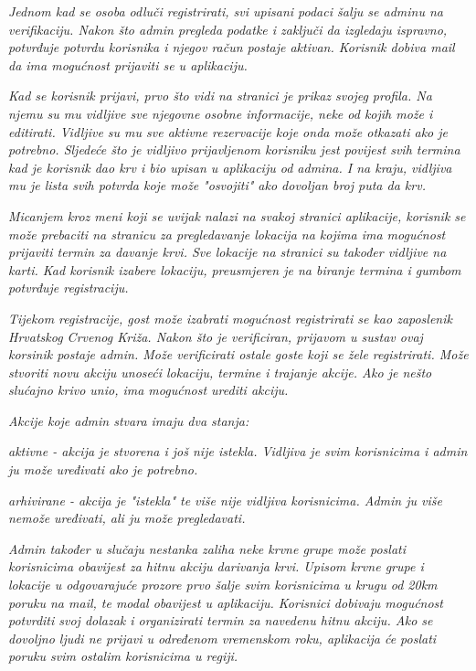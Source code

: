		\textit{Jednom kad se osoba odluči registrirati, svi upisani podaci šalju se adminu na verifikaciju. Nakon što admin pregleda podatke i zaključi da izgledaju ispravno, potvrđuje potvrdu korisnika i njegov račun postaje aktivan. Korisnik dobiva mail da ima mogućnost prijaviti se u aplikaciju. }

		\textit{Kad se korisnik prijavi, prvo što vidi na stranici je prikaz svojeg profila. Na njemu su mu vidljive sve njegovne osobne informacije, neke od kojih može i editirati. Vidljive su mu sve aktivne rezervacije koje onda može otkazati ako je potrebno. Sljedeće što je vidljivo prijavljenom korisniku jest povijest svih termina kad je korisnik dao krv i bio upisan u aplikaciju od admina. I na kraju, vidljiva mu je lista svih potvrda koje može "osvojiti" ako dovoljan broj puta da krv. }

		\textit{Micanjem kroz meni koji se uvijak nalazi na svakoj stranici aplikacije, korisnik se može prebaciti na stranicu za pregledavanje lokacija na kojima ima mogućnost prijaviti termin za davanje krvi. Sve lokacije na stranici su također vidljive na karti. Kad korisnik izabere lokaciju, preusmjeren je na biranje termina i gumbom potvrđuje registraciju. }

		\textit{Tijekom registracije, gost može izabrati mogućnost registrirati se kao zaposlenik Hrvatskog Crvenog Križa. Nakon što je verificiran, prijavom u sustav ovaj korsinik postaje admin. Može verificirati ostale goste koji se žele registrirati. Može stvoriti novu akciju unoseći lokaciju, termine i trajanje akcije. Ako je nešto slućajno krivo unio, ima mogućnost urediti akciju. }

		\textit{Akcije koje admin stvara imaju dva stanja:}

		\begin{packed_item}
				\item \textit{aktivne - akcija je stvorena i još nije istekla. Vidljiva je svim korisnicima i admin ju može uređivati ako je potrebno.}
				\item \textit{arhivirane - akcija je "istekla" te više nije vidljiva korisnicima. Admin ju više nemože uređivati, ali ju može pregledavati.}
		\end{packed_item}



		\textit{Admin također u slučaju nestanka zaliha neke krvne grupe može poslati korisnicima obavijest za hitnu akciju darivanja krvi. Upisom krvne grupe i lokacije u odgovarajuće prozore prvo šalje svim korisnicima u krugu od 20km poruku na mail, te modal obavijest u aplikaciju. Korisnici dobivaju mogućnost potvrditi svoj dolazak i organizirati termin za navedenu hitnu akciju. Ako se dovoljno ljudi ne prijavi u određenom vremenskom roku, aplikacija će poslati poruku svim ostalim korisnicima u regiji.}

